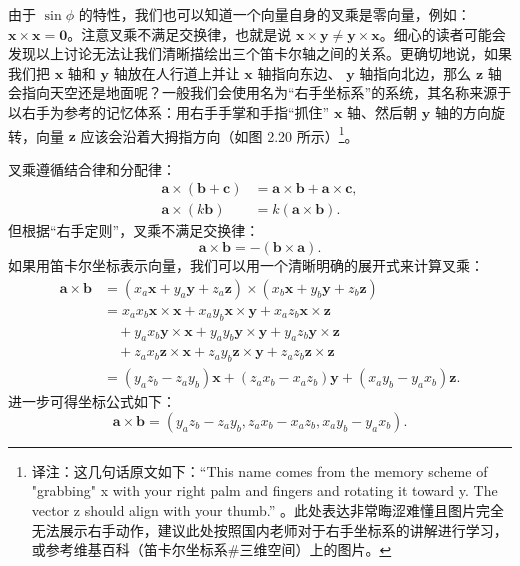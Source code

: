 \documentclass[lang=cn,12pt,marginpar=margintrue]{elegantbook}
\begin{document}
由于 $\sin\phi$ 的特性，我们也可以知道一个向量自身的叉乘是零向量，例如：$\mathbf{x}\times\mathbf{x}=\mathbf{0}$。注意叉乘不满足交换律，也就是说 $\mathbf{x}\times\mathbf{y} \neq \mathbf{y}\times\mathbf{x}$。细心的读者可能会发现以上讨论无法让我们清晰描绘出三个笛卡尔轴之间的关系。更确切地说，如果我们把 $\mathbf{x}$ 轴和 $\mathbf{y}$ 轴放在人行道上并让 $\mathbf{x}$ 轴指向东边、 $\mathbf{y}$ 轴指向北边，那么 $\mathbf{z}$ 轴会指向天空还是地面呢？一般我们会使用名为“右手坐标系”的系统，其名称来源于以右手为参考的记忆体系：用右手手掌和手指“抓住” $\mathbf{x}$ 轴、然后朝 $\mathbf{y}$ 轴的方向旋转，向量 $\mathbf{z}$ 应该会沿着大拇指方向（如图 2.20 所示）\footnote[1]{译注：这几句话原文如下：“This name comes from the memory scheme of "grabbing" x with your right palm and fingers and rotating it toward y. The vector z should align with your thumb.” 。此处表达非常晦涩难懂且图片完全无法展示右手动作，建议此处按照国内老师对于右手坐标系的讲解进行学习，或参考维基百科（笛卡尔坐标系\#三维空间）上的图片。}。


叉乘遵循结合律和分配律：
\[
  \begin{aligned}
    \mathbf{a}\times(\mathbf{b}+\mathbf{c}) & =\mathbf{a}\times\mathbf{b}+\mathbf{a}\times\mathbf{c}, \\
    \mathbf{a}\times(k\mathbf{b})           & =k(\mathbf{a}\times\mathbf{b}).
  \end{aligned}
\]
但根据“右手定则”，叉乘不满足交换律：
\[
  \mathbf{a}\times\mathbf{b}=-(\mathbf{b}\times\mathbf{a}).
\]
如果用笛卡尔坐标表示向量，我们可以用一个清晰明确的展开式来计算叉乘：
\begin{equation}
  \begin{aligned}
    \mathbf{a}\times\mathbf{b}
     & =(x_{a}\mathbf{x}+y_{a}\mathbf{y}+z_{a}\mathbf{z})\times(x_{b}\mathbf{x}+y_{b}\mathbf{y}+z_{b}\mathbf{z})             \\
     & =x_{a}x_{b}\mathbf{x}\times\mathbf{x}+x_{a}y_{b}\mathbf{x}\times\mathbf{y}+x_{a}z_{b}\mathbf{x}\times\mathbf{z}       \\
     & \quad +y_{a}x_{b}\mathbf{y}\times\mathbf{x}+y_{a}y_{b}\mathbf{y}\times\mathbf{y}+y_{a}z_{b}\mathbf{y}\times\mathbf{z} \\
     & \quad +z_{a}x_{b}\mathbf{z}\times\mathbf{x}+z_{a}y_{b}\mathbf{z}\times\mathbf{y}+z_{a}z_{b}\mathbf{z}\times\mathbf{z} \\
     & =(y_{a}z_{b}-z_{a}y_{b})\mathbf{x}+(z_{a}x_{b}-x_{a}z_{b})\mathbf{y}+(x_{a}y_{b}-y_{a}x_{b})\mathbf{z}.
  \end{aligned}
\end{equation}
进一步可得坐标公式如下：
\begin{equation}
  \mathbf{a}\times\mathbf{b}=(y_{a}z_{b}-z_{a}y_{b},z_{a}x_{b}-x_{a}z_{b},x_{a}y_{b}-y_{a}x_{b}).
\end{equation}
\end{document}
